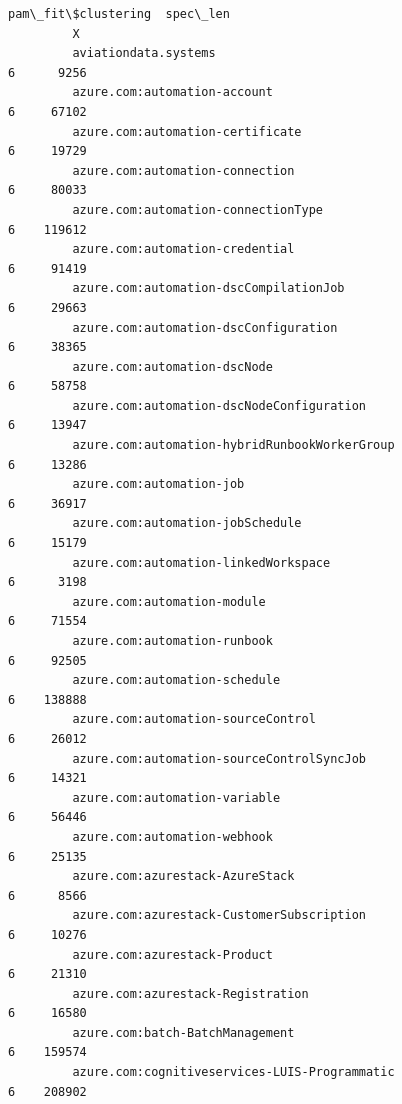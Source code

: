 \documentclass[11pt]{article}
\begin{document}
\begin{Verbatim}[commandchars=\\\{\}]
                                                           pam\_fit\$clustering  spec\_len  
         X                                                                               
         aviationdata.systems                                               6      9256  
         azure.com:automation-account                                       6     67102  
         azure.com:automation-certificate                                   6     19729  
         azure.com:automation-connection                                    6     80033  
         azure.com:automation-connectionType                                6    119612  
         azure.com:automation-credential                                    6     91419  
         azure.com:automation-dscCompilationJob                             6     29663  
         azure.com:automation-dscConfiguration                              6     38365  
         azure.com:automation-dscNode                                       6     58758  
         azure.com:automation-dscNodeConfiguration                          6     13947  
         azure.com:automation-hybridRunbookWorkerGroup                      6     13286  
         azure.com:automation-job                                           6     36917  
         azure.com:automation-jobSchedule                                   6     15179  
         azure.com:automation-linkedWorkspace                               6      3198  
         azure.com:automation-module                                        6     71554  
         azure.com:automation-runbook                                       6     92505  
         azure.com:automation-schedule                                      6    138888  
         azure.com:automation-sourceControl                                 6     26012  
         azure.com:automation-sourceControlSyncJob                          6     14321  
         azure.com:automation-variable                                      6     56446  
         azure.com:automation-webhook                                       6     25135  
         azure.com:azurestack-AzureStack                                    6      8566  
         azure.com:azurestack-CustomerSubscription                          6     10276  
         azure.com:azurestack-Product                                       6     21310  
         azure.com:azurestack-Registration                                  6     16580  
         azure.com:batch-BatchManagement                                    6    159574  
         azure.com:cognitiveservices-LUIS-Programmatic                      6    208902  

\end{Verbatim}
\end{document}
